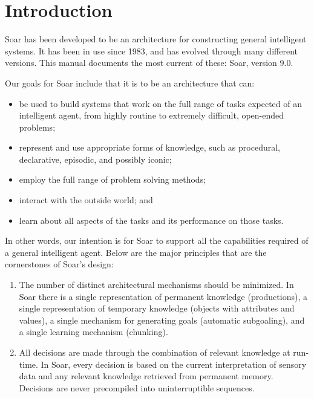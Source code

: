 \chapter{Introduction}
\label{INTRO}

Soar has been developed to be an architecture for constructing general
intelligent systems. It has been in use since 1983, and has evolved through
many different versions. This manual documents the most current of these:
Soar, version 9.0.

Our goals for Soar include that it is to be an architecture that can: \vspace{-12pt}

\begin{itemize} 
\item be used to build systems that work on the full range of tasks expected
	of an \linebreak intelligent agent, from highly routine to extremely difficult,
	open-ended problems;\vspace{-6pt}
\item represent and use appropriate forms of knowledge, such as procedural,
	declarative, episodic, and possibly iconic;\vspace{-6pt}
\item employ the full range of problem solving methods;\vspace{-6pt}
\item interact with the outside world; and\vspace{-6pt}
\item learn about all aspects of the tasks and its performance on those tasks.
\end{itemize} 

In other words, our intention is for Soar to support all the capabilities
required of a general intelligent agent. Below are the major principles that
are the cornerstones of Soar's design:  \vspace{-12pt}

\begin{enumerate} 
\item The number of distinct architectural mechanisms should be minimized.
        In Soar there is a single representation of permanent knowledge
        (productions), a single representation of temporary knowledge (objects
        with attributes and values), a single mechanism for generating goals
        (automatic subgoaling), and a single learning mechanism (chunking).\vspace{-6pt}

\item All decisions are made through the combination of relevant knowledge at
        run-time.  In Soar, every decision is based on the current
        interpretation of sensory data and any relevant knowledge retrieved
        from permanent memory.  Decisions are never precompiled into
        uninterruptible sequences.
\end{enumerate}


